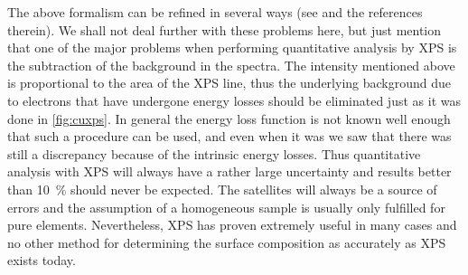 The above formalism can be refined in  several ways (see \cite{briggs} and the references  therein). We shall not deal further with these problems here, but just mention that one of the major problems when performing quantitative analysis by XPS is the subtraction of the background in the spectra. The intensity mentioned above is proportional to the area of the XPS line, thus the underlying background  due  to  electrons that have undergone energy losses should be eliminated just as it was done in \autoref{fig:cuxps}. In general the energy loss function is not known well enough that such a procedure can be used, and even when it was we saw that there was still a discrepancy because of the intrinsic energy losses. Thus quantitative analysis with XPS will always have a rather large uncertainty and results better than \SI{10}{\percent} should never be expected. The satellites will always be a source of errors and the assumption of a homogeneous sample is usually only fulfilled for pure elements. Nevertheless, XPS has proven extremely useful in many cases and no other method for determining the surface composition  as accurately as XPS exists today.

\newpage
